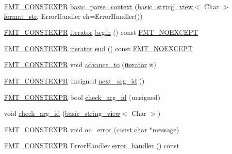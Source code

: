 \begin{DoxyCompactItemize}
\item 
\hyperlink{core_8h_a69201cb276383873487bf68b4ef8b4cd}{F\+M\+T\+\_\+\+C\+O\+N\+S\+T\+E\+X\+PR} \hyperlink{classbasic__parse__context_a623fba02aeaad00d368fd18b61555466}{basic\+\_\+parse\+\_\+context} (\hyperlink{classbasic__string__view}{basic\+\_\+string\+\_\+view}$<$ Char $>$ \hyperlink{format_8h_aa2b402011ee0619f2158f13e0827e585}{format\+\_\+str}, Error\+Handler eh=Error\+Handler())
\item 
\hyperlink{core_8h_a69201cb276383873487bf68b4ef8b4cd}{F\+M\+T\+\_\+\+C\+O\+N\+S\+T\+E\+X\+PR} \hyperlink{classbasic__parse__context_ac3ff96575e89371a99076d8e84dbdbee}{iterator} \hyperlink{classbasic__parse__context_a7310b2c2d78ceba845e0fcc380dc11dd}{begin} () const \hyperlink{core_8h_aef128913e8400683b1cbd1a3a2e11df3}{F\+M\+T\+\_\+\+N\+O\+E\+X\+C\+E\+PT}
\item 
\hyperlink{core_8h_a69201cb276383873487bf68b4ef8b4cd}{F\+M\+T\+\_\+\+C\+O\+N\+S\+T\+E\+X\+PR} \hyperlink{classbasic__parse__context_ac3ff96575e89371a99076d8e84dbdbee}{iterator} \hyperlink{classbasic__parse__context_a98a62ad72f0a71feb602f74d9e4a2434}{end} () const \hyperlink{core_8h_aef128913e8400683b1cbd1a3a2e11df3}{F\+M\+T\+\_\+\+N\+O\+E\+X\+C\+E\+PT}
\item 
\hyperlink{core_8h_a69201cb276383873487bf68b4ef8b4cd}{F\+M\+T\+\_\+\+C\+O\+N\+S\+T\+E\+X\+PR} void \hyperlink{classbasic__parse__context_ad75183c1c2299c4a34f82265156fe99d}{advance\+\_\+to} (\hyperlink{classbasic__parse__context_ac3ff96575e89371a99076d8e84dbdbee}{iterator} it)
\item 
\hyperlink{core_8h_a69201cb276383873487bf68b4ef8b4cd}{F\+M\+T\+\_\+\+C\+O\+N\+S\+T\+E\+X\+PR} unsigned \hyperlink{classbasic__parse__context_aff323793124411a7c83d53f3e007b10f}{next\+\_\+arg\+\_\+id} ()
\item 
\hyperlink{core_8h_a69201cb276383873487bf68b4ef8b4cd}{F\+M\+T\+\_\+\+C\+O\+N\+S\+T\+E\+X\+PR} bool \hyperlink{classbasic__parse__context_a17562843a84ff128340e4b64fa66911e}{check\+\_\+arg\+\_\+id} (unsigned)
\item 
void \hyperlink{classbasic__parse__context_af01556b56c7dd8e4c1c0692687125b96}{check\+\_\+arg\+\_\+id} (\hyperlink{classbasic__string__view}{basic\+\_\+string\+\_\+view}$<$ Char $>$)
\item 
\hyperlink{core_8h_a69201cb276383873487bf68b4ef8b4cd}{F\+M\+T\+\_\+\+C\+O\+N\+S\+T\+E\+X\+PR} void \hyperlink{classbasic__parse__context_aaef39fb2abf13cfee75cdc54519c5322}{on\+\_\+error} (const char $\ast$message)
\item 
\hyperlink{core_8h_a69201cb276383873487bf68b4ef8b4cd}{F\+M\+T\+\_\+\+C\+O\+N\+S\+T\+E\+X\+PR} Error\+Handler \hyperlink{classbasic__parse__context_a3d7ff4e0bfe29c60c028b6d7c3ed1c1c}{error\+\_\+handler} () const
\end{DoxyCompactItemize}


